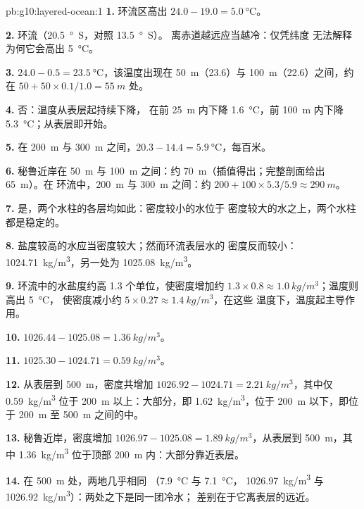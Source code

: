 \begin{solution}{pb:g10:layered-ocean:1}
\textbf{1.} 环流区高出 $24.0 - 19.0 = \qty{5.0}{\degreeCelsius}$。

\textbf{2.} 环流（\qty{20.5}{\degree S}，对照 \qty{13.5}{\degree S}）。
离赤道越远应当越冷：仅凭纬度
无法解释为何它会高出 \qty{5}{\degreeCelsius}。

\textbf{3.} $24.0 - 0.5 = \qty{23.5}{\degreeCelsius}$，该温度出现在
\qty{50}{m}（23.6）与 \qty{100}{m}（22.6）之间，约在 $50 + 50 \times
0.1/1.0 = \qty{55}{m}$ 处。

\textbf{4.} 否：温度从表层起持续下降，
在前 \qty{25}{m} 内下降 \qty{1.6}{\degreeCelsius}，前 \qty{100}{m} 内下降
\qty{5.3}{\degreeCelsius}；从表层即开始。

\textbf{5.} 在 \qty{200}{m} 与 \qty{300}{m} 之间，$20.3 - 14.4 =
\qty{5.9}{\degreeCelsius}$，每百米。

\textbf{6.} 秘鲁近岸在 \qty{50}{m} 与 \qty{100}{m} 之间：约
\qty{70}{m}（插值得出；完整剖面给出 \qty{65}{m}）。在
环流中，\qty{200}{m} 与 \qty{300}{m} 之间：约 $200 + 100 \times 5.3/5.9
\approx \qty{290}{m}$。

\textbf{7.} 是，两个水柱的各层均如此：密度较小的水位于
密度较大的水之上，两个水柱都是稳定的。

\textbf{8.} 盐度较高的水应当密度较大；然而环流表层水的
密度反而较小：\qty{1024.71}{kg/m^3}，另一处为 \qty{1025.08}{kg/m^3}。

\textbf{9.} 环流中的水盐度约高 1.3 个单位，使密度增加约
$1.3 \times 0.8 \approx \qty{1.0}{kg/m^3}$；温度则高出 \qty{5}{\degreeCelsius}，
使密度减小约 $5 \times 0.27 \approx \qty{1.4}{kg/m^3}$，在这些
温度下，温度起主导作用。

\textbf{10.} $1026.44 - 1025.08 = \qty{1.36}{kg/m^3}$。

\textbf{11.} $1025.30 - 1024.71 = \qty{0.59}{kg/m^3}$。

\textbf{12.} 从表层到 \qty{500}{m}，密度共增加
$1026.92 - 1024.71 = \qty{2.21}{kg/m^3}$，其中仅 \qty{0.59}{kg/m^3}
位于 \qty{200}{m} 以上：大部分，即 \qty{1.62}{kg/m^3}，位于
\qty{200}{m} 以下，即位于 \qty{200}{m} 至 \qty{500}{m} 之间的中。

\textbf{13.} 秘鲁近岸，密度增加 $1026.97 - 1025.08 =
\qty{1.89}{kg/m^3}$，从表层到 \qty{500}{m}，其中
\qty{1.36}{kg/m^3} 位于顶部 \qty{200}{m} 内：大部分靠近表层。

\textbf{14.} 在 \qty{500}{m} 处，两地几乎相同
（\qty{7.9}{\degreeCelsius} 与 \qty{7.1}{\degreeCelsius}，
\qty{1026.97}{kg/m^3} 与 \qty{1026.92}{kg/m^3}）：两处之下是同一团冷水；
差别在于它离表层的远近。


\end{solution}
